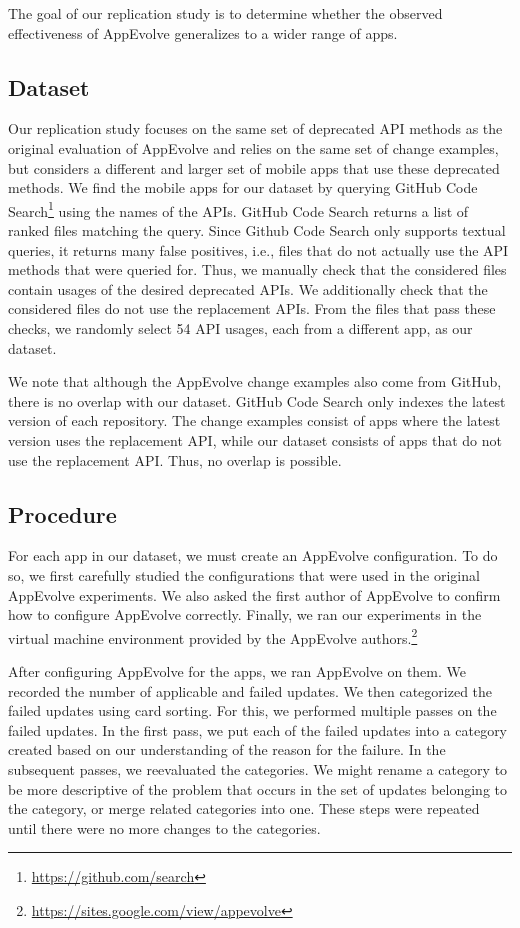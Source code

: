 The goal of our replication study is to determine whether the observed
effectiveness of AppEvolve generalizes to a wider range of apps.

\subsection{Dataset}
Our replication study focuses on the same set of deprecated API methods as the
original evaluation of AppEvolve and relies on the same set of change
examples, but considers a different and larger set of mobile apps that use
these deprecated methods.  We find the mobile apps for our dataset by
querying GitHub Code Search\footnote{\url{https://github.com/search}} using
the names of the APIs. GitHub Code Search returns a list of ranked files
matching the query. Since Github Code Search only supports textual queries,
it returns many false positives, i.e., files that do not actually use the
API methods that were queried for.  Thus, we manually check that the
considered files contain usages of the desired deprecated APIs.  We
additionally check that the considered files do not use the replacement
APIs. From the files that pass these checks, we randomly select 54 API
usages, each from a different app, as our dataset.

We note that although the AppEvolve change examples also come from GitHub,
there is no overlap with our dataset.  GitHub Code Search only indexes the
latest version of each repository.  The change examples consist of apps
where the latest version uses the replacement API, while our dataset
consists of apps that do not use the replacement API.  Thus, no overlap is
possible.

\subsection{Procedure}
For each app in our dataset, we must create an AppEvolve configuration. To
do so, we first carefully studied the configurations that were used in the
original AppEvolve experiments. We also asked the first author of AppEvolve
to confirm how to configure AppEvolve correctly. Finally, we ran our
experiments in the virtual machine environment provided by the AppEvolve
authors.\footnote{\url{https://sites.google.com/view/appevolve}}

After configuring AppEvolve for the apps, we ran AppEvolve on them. We
recorded the number of applicable and failed updates. We then categorized
the failed updates using card sorting\cite{spencer09}. For this, we performed
multiple passes on the failed updates. In the first pass, we put each
of the failed updates into a category created based on our understanding of
the reason for the failure. In the subsequent passes, we reevaluated the
categories. We might rename a category to be more descriptive of the
problem that occurs in the set of updates belonging to the category, or
merge related categories into one. These steps were repeated until there
were no more changes to the categories.
